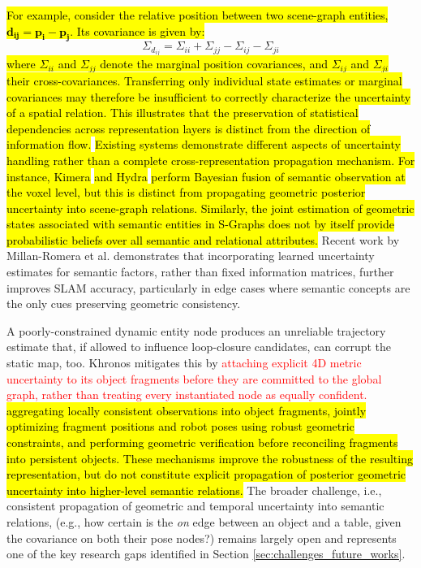 \hl{For example, consider the relative position between two scene-graph entities, $\mathbf{d_{ij}} = \mathbf{p_i} - \mathbf{p_j}$. Its covariance is given by:}
\begin{equation}
    \Sigma_{d_{ij}} = \Sigma_{ii} + \Sigma_{jj} - \Sigma_{ij} - \Sigma_{ji}
\end{equation}
\hl{where $\Sigma_{ii}$ and $\Sigma_{jj}$ denote the marginal position covariances, and $\Sigma_{ij}$ and $\Sigma_{ji}$ their cross-covariances. Transferring only individual state estimates or marginal covariances may therefore be insufficient to correctly characterize the uncertainty of a spatial relation. This illustrates that the preservation of statistical dependencies across representation layers is distinct from the direction of information flow.}
\hl{Existing systems demonstrate different aspects of uncertainty handling rather than a complete cross-representation propagation mechanism. For instance, Kimera} \cite{rosinol_kimera_2021} \hl{ and Hydra }\cite{hughes_hydra_2022} \hl{perform Bayesian fusion of semantic observation at the voxel level, but this is distinct from propagating geometric posterior uncertainty into scene-graph relations. Similarly, the joint estimation of geometric states associated with semantic entities in S-Graphs does not by itself provide probabilistic beliefs over all semantic and relational attributes.}
Recent work by Millan-Romera et al. \cite{millanromera2026generationuncertaintyawarehighlevelspatial} demonstrates that incorporating learned uncertainty estimates for semantic factors, rather than fixed information matrices, further improves SLAM accuracy, particularly in edge cases where semantic concepts are the only cues preserving geometric consistency.

A poorly-constrained dynamic entity node produces an unreliable trajectory estimate that, if allowed to influence loop-closure candidates, can corrupt the static map, too\cite{giberna_dynemo-slam_2025}.
Khronos \cite{schmid_khronos_2024} mitigates this by \textcolor{red}{attaching explicit 4D metric uncertainty to its object fragments before they are committed to the global graph, rather than treating every instantiated node as equally confident.} \hl{aggregating locally consistent observations into object fragments, jointly optimizing fragment positions and robot poses using robust geometric constraints, and performing geometric verification before reconciling fragments into persistent objects. 
These mechanisms improve the robustness of the resulting representation, but do not constitute explicit propagation of posterior geometric uncertainty into higher-level semantic relations.} 
The broader challenge, i.e., consistent propagation of geometric and temporal uncertainty into semantic relations, (e.g., how certain is the \textit{on} edge between an object and a table, given the covariance on both their pose nodes?) remains largely open and represents one of the key research gaps identified in Section \ref{sec:challenges_future_works}.

